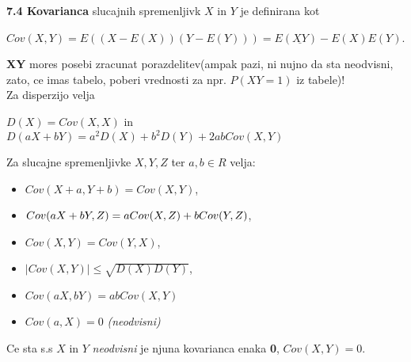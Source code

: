 \documentclass{article}
\begin{document}
\begin{multicols}{2}
	\textbf{7.4 Kovarianca} slucajnih spremenljivk $X$ in $Y$ je definirana kot
	\begin{center}
		\begin{math}
			Cov(X,Y) = E((X - E(X)) (Y - E(Y))) = E(\underline{XY}) - E(X)E(Y)
		\end{math}.
	\end{center}
	\textbf{XY} mores posebi zracunat porazdelitev(ampak pazi, ni nujno da sta neodvisni, zato, ce imas tabelo, poberi vrednosti za npr. $P(XY = 1)$ iz tabele)!\\
	Za disperzijo velja
	\begin{center}
		\begin{math}
			D(X) = Cov(X, X)
		\end{math} in\\
		\begin{math}
			D(aX + bY) = a^2D(X) + b^2D(Y) + 2abCov(X, Y)
		\end{math}
	\end{center}
	Za slucajne spremenljivke $X, Y, Z$ ter $a,b \in R$ velja:
	\begin{itemize}
		\item \begin{math}
			      Cov(X + a, Y + b) = Cov(X, Y)
		      \end{math},
		\item \begin{math}
			      Cov(aX + bY, Z) =\\ aCov(X, Z) + bCov(Y,Z)
		      \end{math},
		\item \begin{math}
			      Cov(X, Y) = Cov(Y, X)
		      \end{math},
		\item \begin{math}
			      |Cov(X, Y)| \leq \sqrt{D(X)D(Y)}
		      \end{math},
		\item \begin{math}
			      Cov(aX, bY) = abCov(X, Y)
		      \end{math}
		\item \begin{math}
			      Cov(a, X) = 0
		      \end{math} \textit{(neodvisni)}
	\end{itemize}

	Ce sta s.s $X$ in $Y$ \textit{neodvisni} je njuna kovarianca enaka \textbf{0},
	$Cov(X,Y) = 0$.


\end{multicols}
\end{document}
